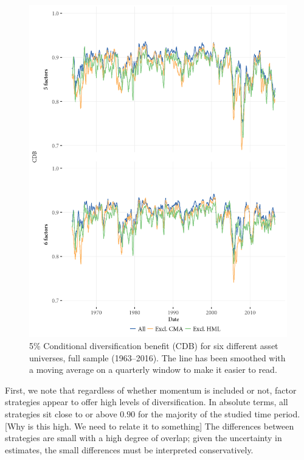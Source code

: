 \begin{figure}
  \centering
  \footnotesize
  \renewcommand{\arraystretch}{1.2}
  \caption{5\% Conditional diversification benefit (CDB) for six different asset universes, full sample (1963--2016). 
  The line has been smoothed with a moving average on a quarterly window to make it easier to read.}
  \label{fig:cdb}
  \includegraphics[scale = 1]{graphics/cdb_5F_6F.png}
\end{figure}

First, we note that regardless of whether momentum is included or not, factor strategies appear to offer high levels of diversification. In absolute terms, all strategies sit close to or above $0.90$ for the majority of the studied time period. [Why is this high. We need to relate it to something] The differences between strategies are small with a high degree of overlap; given the uncertainty in estimates, the small differences must be interpreted conservatively.

